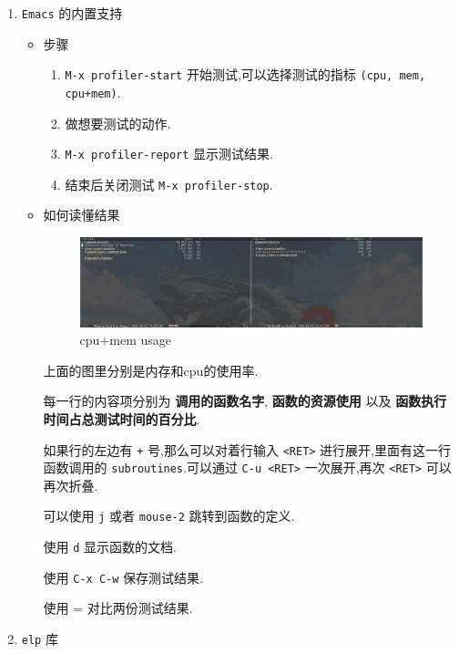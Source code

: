 \documentclass[11pt]{article}
\begin{document}
\begin{enumerate}
\item \texttt{Emacs} 的内置支持

\begin{itemize}
\item 步骤

\begin{enumerate}
\item \texttt{M-x profiler-start} 开始测试,可以选择测试的指标 \texttt{(cpu, mem, cpu+mem)}.

\item 做想要测试的动作.

\item \texttt{M-x profiler-report} 显示测试结果.

\item 结束后关闭测试 \texttt{M-x profiler-stop}.
\end{enumerate}

\item 如何读懂结果

\begin{figure}[htbp]
\centering
\includegraphics[width=.9\linewidth]{../../../files/cpu-mem.png}
\caption{cpu+mem usage}
\end{figure}

上面的图里分别是内存和cpu的使用率.

每一行的内容项分别为 \textbf{调用的函数名字}, \textbf{函数的资源使用} 以及 \textbf{函数执行时间占总测试时间的百分比}.

如果行的左边有 \texttt{+} 号,那么可以对着行输入 \texttt{<RET>} 进行展开,里面有这一行函数调用的 \texttt{subroutines}.可以通过 \texttt{C-u <RET>} 一次展开,再次 \texttt{<RET>} 可以再次折叠.

可以使用 \texttt{j} 或者 \texttt{mouse-2} 跳转到函数的定义.

使用 \texttt{d} 显示函数的文档.

使用 \texttt{C-x C-w} 保存测试结果.

使用 = 对比两份测试结果.
\end{itemize}

\item \texttt{elp} 库


\end{enumerate}
\end{document}
